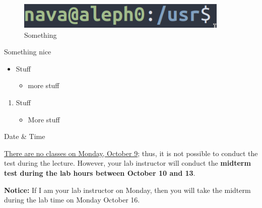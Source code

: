 
\begin{figure}[h]
    \begin{center}
        \includegraphics[width=0.9\textwidth]{Figures/1}
    \end{center}
\caption{Something}
\end{figure}




\begin{quotebox}{\bccrayon}

    Something nice

\end{quotebox}

\begin{itemize}

    \item Stuff

        \begin{itemize}
        
            \item more stuff
            
        \end{itemize}
    
\end{itemize}

\begin{enumerate}

    \item Stuff

        \begin{itemize}
        
            \item More stuff
            
        \end{itemize}

\end{enumerate}

\begin{step}{Date \& Time}

    \underline{There are no classes on Monday, October 9}; thus, it is not possible to conduct the test during the lecture. However, your lab instructor will conduct the \textbf{midterm test during the lab hours between October 10 and 13}. 

    \textbf{Notice:} If I am your lab instructor on Monday, then you will take the midterm during the lab time on Monday October 16.

\end{step}

